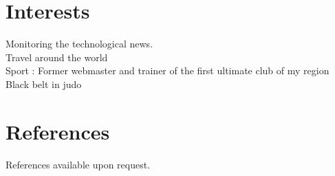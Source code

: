 \documentclass[]{friggeri-cv} %
\begin{document}




\section{Interests}
Monitoring the technological news.\\
Travel around the world\\
Sport : Former webmaster and trainer of the first ultimate club of my region\\
Black belt in judo

\section{References}

References available upon request.
\end{document}
